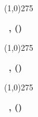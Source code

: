 \begin{folhaaprovacao}
	\ifbancaTresExiste
	{\vspace{14pt}\line(1,0){275}\par
	\textbf{\bancaTres\ , \bancaTresTitulo (\bancaTresSigla)}\par}
	\else
	\fi

	\ifbancaQuatroExiste
	{\vspace{14pt}\line(1,0){275}\par
	\textbf{\bancaQuatro\ , \bancaQuatroTitulo (\bancaQuatroSigla)}\par}
	\else
	\fi

	\ifbancaCincoExiste
	{\vspace{14pt}\line(1,0){275}\par
		\textbf{\bancaCinco\ , \bancaCincoTitulo (\bancaCincoSigla)}\par}
	\else
	\fi


	\vfill
	\cidadeCEP\par
	\ano\par
\end{folhaaprovacao}